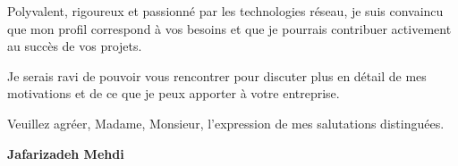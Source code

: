 \documentclass[11pt,a4paper]{letter}
\begin{document}
\vspace{0.5cm}
Polyvalent, rigoureux et passionné par les technologies réseau, je suis convaincu que mon profil correspond à vos besoins et que je pourrais contribuer activement au succès de vos projets.

\vspace{0.5cm}
Je serais ravi de pouvoir vous rencontrer pour discuter plus en détail de mes motivations et de ce que je peux apporter à votre entreprise.


\vspace{1cm}

\noindent Veuillez agréer, Madame, Monsieur, l'expression de mes salutations distinguées.

\vspace{2cm}

\noindent\textbf{Jafarizadeh Mehdi}
\end{document}

